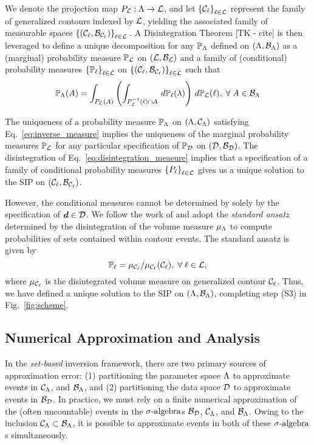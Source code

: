 We denote the projection map $P_{\mathcal{L}} :{\Lambda} \to \mathcal{L}$, and let $\left\{\mathcal{C}_\ell\right\}_{\ell\in\mathcal{L}}$ represent the family of generalized contours indexed by $\mathcal{L}$, yielding the associated family of measurable spaces $\left\{\left ( \mathcal{C}_\ell, \mathcal{B}_{\mathcal{C}_\ell} \right )\right\}_{\ell\in\mathcal{L}}{}$. 
A Disintegration Theorem [TK - cite] is then leveraged to define a unique decomposition for any $\mathbb{P}_{\Lambda}$ defined on $({\Lambda}, \mathcal{B}_{{\Lambda}})$ as a (marginal) probability measure $\mathbb{P}_{\mathcal{L}}$ on $(\mathcal{L}, \mathcal{B}_{\mathcal{L}})$ and a family of (conditional) probability measures $\left\{\mathbb{P}_\ell\right\}_{\ell\in\mathcal{L}}$ on $\left\{\left ( \mathcal{C}_\ell, \mathcal{B}_{\mathcal{C}_\ell} \right )\right\}_{\ell\in\mathcal{L}}$ such that 
\begin{equation}\label{eq:disintegration_measure}
\mathbb{P}_{\Lambda} (A) = \int_{P_{\mathcal{L}}(A)} \left ( \int_{P_{\mathcal{L}}^{-1} (\ell) \cap A}\, d\mathbb{P}_\ell(\lambda) \right )\, d\mathbb{P}_{\mathcal{L}} (\ell), \; \forall \; A \in \mathcal{B}_{{\Lambda}} 
\end{equation}


The uniqueness of a probability measure $\mathbb{P}_{\Lambda}$ on ${({\Lambda}, \mathcal{C}_{\Lambda})}$ satisfying Eq.~\eqref{eq:inverse_measure} implies the uniqueness of the marginal probability measures $\mathbb{P}_{\mathcal{L}}$ for any particular specification of $\mathbb{P}_{\mathcal{D}}$ on ${(\mathcal{D}, \mathcal{B}_{\mathcal{D}})}$. 
The disintegration of Eq.~\eqref{eq:disintegration_measure} implies that a specification of a family of conditional probability measures $\left\{P_\ell\right\}_{\ell\in\mathcal{L}}$ gives us a unique solution to the SIP on ${(\mathcal{C}_\ell, \mathcal{B}_{\mathcal{C}_\ell})}$.
 
However, the conditional measures cannot be determined by solely by the specification of $\operatorname*{\boldsymbol{d}}\in\mathcal{D}$. 
We follow the work of \cite{BET+14} and adopt the \emph{standard ansatz} determined by the disintegration of the volume measure $\mu_{{\Lambda}}$ to compute probabilities of sets contained within contour events. 
The standard ansatz is given by 
\begin{equation}\label{eq:standard_ansatz}
\mathbb{P}_\ell = \mu_{\mathcal{C}_\ell} / \mu_{\mathcal{C}_\ell}(\mathcal{C}_\ell), \; \forall \; \ell \in \mathcal{L},
\end{equation}
where $\mu_{\mathcal{C}_\ell}$ is the disintegrated volume measure on generalized contour $\mathcal{C}_\ell$.
Thus, we have defined a unique solution to the SIP on ${({\Lambda}, \mathcal{B}_{{\Lambda}})}$, completing step (S3) in Fig.~\ref{fig:scheme}. 




\subsection{Numerical Approximation and Analysis}\label{sec:numericalapprox}
In the \emph{set-based} inversion framework, there are two primary sources of approximation error: (1) partitioning the parameter space ${\Lambda}$ to approximate events in $\mathcal{C}_{\Lambda}$, and $\mathcal{B}_{{\Lambda}}$, and (2) partitioning the data space $\mathcal{D}$ to approximate events in $\mathcal{B}_{\mathcal{D}}$.
In practice, we must rely on a finite numerical approximation of the (often uncountable) events in the $\sigma\text{-algebra}$s $\mathcal{B}_{\mathcal{D}}$, $\mathcal{C}_{\Lambda}$, and $\mathcal{B}_{{\Lambda}}$.
Owing to the inclusion $\mathcal{C}_{\Lambda} \subset \mathcal{B}_{{\Lambda}}$, it is possible to approximate events in both of these $\sigma\text{-algebra}$s simultaneously. 

